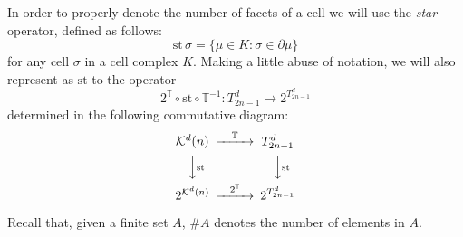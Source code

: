\documentclass[journal]{IEEEtran}
\begin{document}
In order to properly denote the number of facets of a cell we will use
the \emph{star} operator, defined as follows:
$$
\mathrm{st}\,\sigma= \{\mu \in K: \sigma \in \partial \mu\}
$$
for any cell $\sigma$ in a cell complex $K$. Making a little abuse of notation, 
we will also represent as $\mathrm{st}$ to the operator 
$$
2^\mathbb{T} \circ \mathrm{st} \circ \mathbb{T}^{-1} : T_{2n-1}^d \rightarrow 2^{T_{2n-1}^d}
$$
determined in the following commutative diagram:
$$
\begin{CD}
\mathcal{K}^d (n) 	@>\mathbb{T}>> 	T_{2n-1}^d \\
@VV{\mathrm{st}}V						@VV{\mathrm{st}}V\\
2^{\mathcal{K}^d(n)} @>2^\mathbb{T}>> 2^{T_{2n-1}^d}
\end{CD}
$$

Recall that, given a finite set $A$, $\#A$ denotes the number of elements in $A$.
\end{document}
